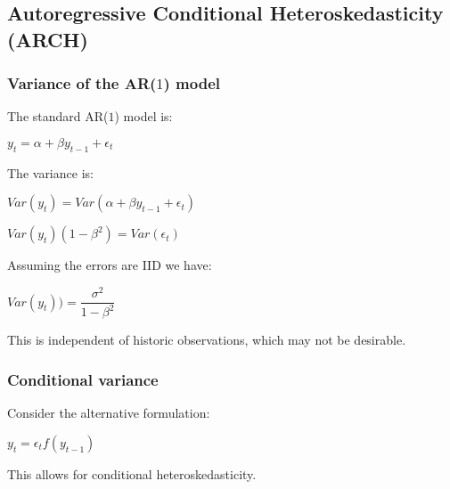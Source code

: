 
\subsection{Autoregressive Conditional Heteroskedasticity (ARCH)}

\subsubsection{Variance of the AR(\(1\)) model}

The standard AR(\(1\)) model is:

\(y_t=\alpha + \beta y_{t-1}+\epsilon_t \)

The variance is:

\(Var(y_t)=Var(\alpha + \beta y_{t-1}+\epsilon_t)\)

\(Var(y_t)(1-\beta^2)=Var(\epsilon_t)\)

Assuming the errors are IID we have:

\(Var(y_t))=\dfrac{\sigma^2 }{1-\beta^2 }\)

This is independent of historic observations, which may not be desirable.

\subsubsection{Conditional variance}

Consider the alternative formulation:

\(y_t=\epsilon_t f(y_{t-1})\)

This allows for conditional heteroskedasticity.

